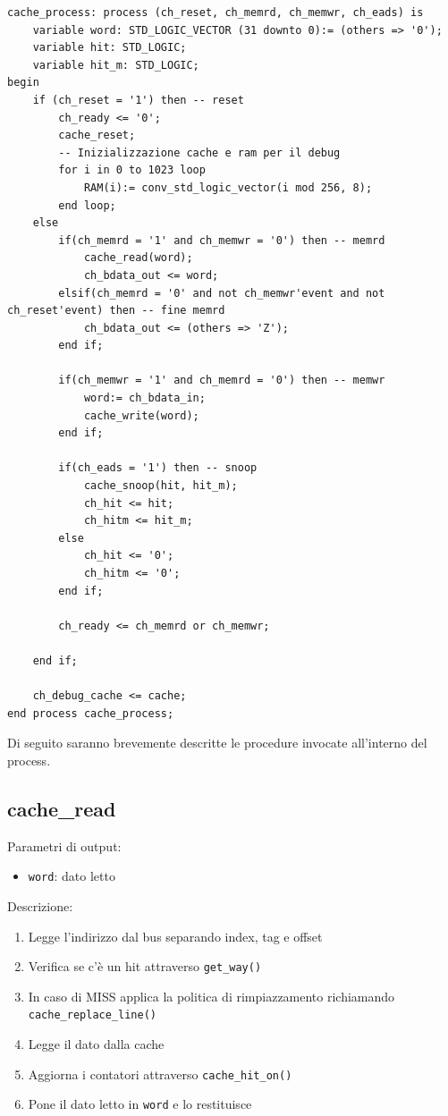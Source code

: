 \begin{lstlisting}
cache_process: process (ch_reset, ch_memrd, ch_memwr, ch_eads) is
	variable word: STD_LOGIC_VECTOR (31 downto 0):= (others => '0');
	variable hit: STD_LOGIC;
	variable hit_m: STD_LOGIC;
begin
	if (ch_reset = '1') then -- reset
		ch_ready <= '0';
		cache_reset;
		-- Inizializzazione cache e ram per il debug			
		for i in 0 to 1023 loop
			RAM(i):= conv_std_logic_vector(i mod 256, 8);
		end loop;
	else
		if(ch_memrd = '1' and ch_memwr = '0') then -- memrd
			cache_read(word);
			ch_bdata_out <= word;
		elsif(ch_memrd = '0' and not ch_memwr'event and not ch_reset'event) then -- fine memrd
			ch_bdata_out <= (others => 'Z');
		end if;
				
		if(ch_memwr = '1' and ch_memrd = '0') then -- memwr
			word:= ch_bdata_in;
			cache_write(word);
		end if;
		
		if(ch_eads = '1') then -- snoop
			cache_snoop(hit, hit_m);
			ch_hit <= hit;
			ch_hitm <= hit_m;
		else
			ch_hit <= '0';
			ch_hitm <= '0';
		end if;
		
		ch_ready <= ch_memrd or ch_memwr;
			
	end if;
		
	ch_debug_cache <= cache;
end process cache_process;
\end{lstlisting}

Di seguito saranno brevemente descritte le procedure invocate all'interno del process.


\subsection{cache\_read} %

Parametri di output:
\begin{itemize}
  \item \texttt{word}: dato letto
\end{itemize}


Descrizione:
\begin{enumerate}
  \item Legge l'indirizzo dal bus separando index, tag e offset
  \item Verifica se c'\`e un hit attraverso \texttt{get\_way()}
  \item In caso di MISS applica la politica di rimpiazzamento richiamando \texttt{cache\_replace\_line()}
  \item Legge il dato dalla cache
  \item Aggiorna i contatori attraverso \texttt{cache\_hit\_on()}
  \item Pone il dato letto in \texttt{word} e lo restituisce 
\end{enumerate}	

